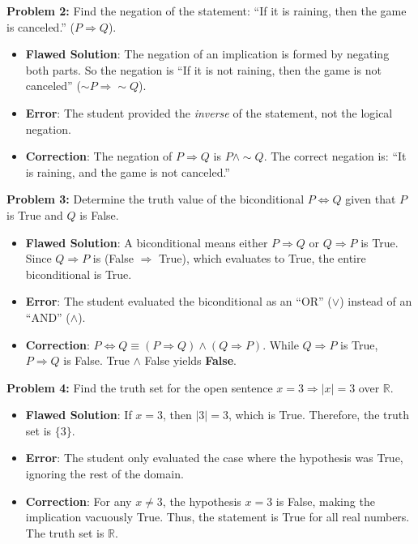 \documentclass[11pt]{article}
\begin{document}
\vspace{10pt}
\textbf{Problem 2:} Find the negation of the statement: ``If it is raining, then the game is canceled.'' ($P \Rightarrow Q$).
\begin{itemize}
    \item \textbf{Flawed Solution}: The negation of an implication is formed by negating both parts. So the negation is ``If it is not raining, then the game is not canceled'' ($\sim P \Rightarrow \sim Q$).
    \item \textbf{Error}: The student provided the \textit{inverse} of the statement, not the logical negation.
    \item \textbf{Correction}: The negation of $P \Rightarrow Q$ is $P \wedge \sim Q$. The correct negation is: ``It is raining, and the game is not canceled.''
\end{itemize}

\vspace{10pt}
\textbf{Problem 3:} Determine the truth value of the biconditional $P \Leftrightarrow Q$ given that $P$ is True and $Q$ is False.
\begin{itemize}
    \item \textbf{Flawed Solution}: A biconditional means either $P \Rightarrow Q$ or $Q \Rightarrow P$ is True. Since $Q \Rightarrow P$ is (False $\Rightarrow$ True), which evaluates to True, the entire biconditional is True.
    \item \textbf{Error}: The student evaluated the biconditional as an ``OR'' ($\vee$) instead of an ``AND'' ($\wedge$).
    \item \textbf{Correction}: $P \Leftrightarrow Q \equiv (P \Rightarrow Q) \wedge (Q \Rightarrow P)$. While $Q \Rightarrow P$ is True, $P \Rightarrow Q$ is False. True $\wedge$ False yields \textbf{False}.
\end{itemize}

\vspace{10pt}
\textbf{Problem 4:} Find the truth set for the open sentence $x = 3 \Rightarrow |x| = 3$ over $\mathbb{R}$.
\begin{itemize}
    \item \textbf{Flawed Solution}: If $x = 3$, then $|3| = 3$, which is True. Therefore, the truth set is $\{3\}$.
    \item \textbf{Error}: The student only evaluated the case where the hypothesis was True, ignoring the rest of the domain.
    \item \textbf{Correction}: For any $x \neq 3$, the hypothesis $x = 3$ is False, making the implication vacuously True. Thus, the statement is True for all real numbers. The truth set is \textbf{$\mathbb{R}$}.
\end{itemize}
\end{document}
